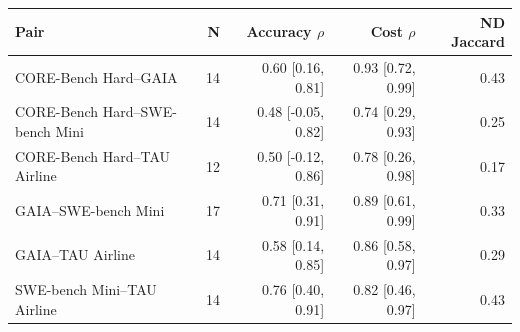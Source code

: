 \begin{tabular}{lrrrr}
\toprule
Pair & N & Accuracy $\rho$ & Cost $\rho$ & ND Jaccard \\
\midrule
CORE-Bench Hard--GAIA & 14 & 0.60 [0.16, 0.81] & 0.93 [0.72, 0.99] & 0.43 \\
CORE-Bench Hard--SWE-bench Mini & 14 & 0.48 [-0.05, 0.82] & 0.74 [0.29, 0.93] & 0.25 \\
CORE-Bench Hard--TAU Airline & 12 & 0.50 [-0.12, 0.86] & 0.78 [0.26, 0.98] & 0.17 \\
GAIA--SWE-bench Mini & 17 & 0.71 [0.31, 0.91] & 0.89 [0.61, 0.99] & 0.33 \\
GAIA--TAU Airline & 14 & 0.58 [0.14, 0.85] & 0.86 [0.58, 0.97] & 0.29 \\
SWE-bench Mini--TAU Airline & 14 & 0.76 [0.40, 0.91] & 0.82 [0.46, 0.97] & 0.43 \\
\bottomrule
\end{tabular}
